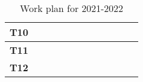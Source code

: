 \begin{table}[!h]
\begin{tabular}{c|c|c|c|c|c|c|c|c|c|c|c}
	\textbf{T10}     &                                                     &                                                     &                                                     &                                                     &                                                     &                                                     &                                                     &                                                     & \textbf{\checkmark} &                                                     &                                                     \\ \hline
	\textbf{T11}     &                                                     &                                                     &                                                     &                                                     &                                                     &                                                     &                                                     &                                                     &                                                     & \textbf{\checkmark} &                                                     \\ \hline
	\textbf{T12}     &                                                     &                                                     &                                                     &                                                     &                                                     &                                                     &                                                     &                                                     &                                                     &                                                     & \textbf{\checkmark}
	\end{tabular}
	\caption{Work plan for 2021-2022}
	\label{tab:schedule}
\end{table}